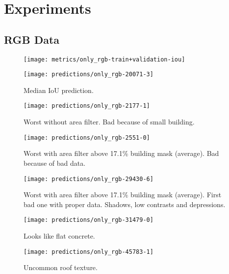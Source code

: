 \section{Experiments}%
\label{sec:experiments}

\subsection{RGB Data}%
\label{sec:rgb-experiment}

\begin{figure}[H]
  \centering
  \texttt{[image: metrics/only\_rgb-train+validation-iou]}
\end{figure}

\begin{figure}[H]
  \centering
  \texttt{[image: predictions/only\_rgb-20071-3]}  %
  \caption{%
    Median IoU prediction.
  }
\end{figure}

\begin{figure}[H]
  \centering
  \texttt{[image: predictions/only\_rgb-2177-1]}  %
  \caption{%
    Worst without area filter.
    Bad because of small building.
  }
\end{figure}

\begin{figure}[H]
  \centering
  \texttt{[image: predictions/only\_rgb-2551-0]}  %
  \caption{%
    Worst with area filter above 17.1\% building mask (average).
    Bad because of bad data.
  }
\end{figure}

\begin{figure}[H]
  \centering
  \texttt{[image: predictions/only\_rgb-29430-6]}  %
  \caption{%
    Worst with area filter above 17.1\% building mask (average).
    First bad one with proper data.
    Shadows, low contrasts and depressions.
  }
\end{figure}

\begin{figure}[H]
  \centering
  \texttt{[image: predictions/only\_rgb-31479-0]}  %
  \caption{%
    Looks like flat concrete.
  }
\end{figure}

\begin{figure}[H]
  \centering
  \texttt{[image: predictions/only\_rgb-45783-1]}  %
  \caption{%
    Uncommon roof texture.
  }
\end{figure}

